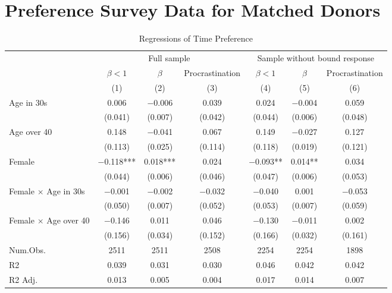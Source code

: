 \documentclass[
]{article}
\begin{document}
\hypertarget{preference-survey-data-for-matched-donors}{%
\section{Preference Survey Data for Matched Donors}\label{preference-survey-data-for-matched-donors}}

\begin{table}

\caption{\label{tab:time-discount}Regressions of Time Preference}
\centering
\fontsize{9}{11}\selectfont
\begin{tabular}[t]{lcccccc}
\toprule
\multicolumn{1}{c}{ } & \multicolumn{3}{c}{Full sample} & \multicolumn{3}{c}{Sample without bound response} \\
\cmidrule(l{3pt}r{3pt}){2-4} \cmidrule(l{3pt}r{3pt}){5-7}
\multicolumn{1}{c}{ } & \multicolumn{1}{c}{$\beta < 1$} & \multicolumn{1}{c}{$\beta$} & \multicolumn{1}{c}{Procrastination} & \multicolumn{1}{c}{$\beta < 1$} & \multicolumn{1}{c}{$\beta$} & \multicolumn{1}{c}{Procrastination} \\
\cmidrule(l{3pt}r{3pt}){2-2} \cmidrule(l{3pt}r{3pt}){3-3} \cmidrule(l{3pt}r{3pt}){4-4} \cmidrule(l{3pt}r{3pt}){5-5} \cmidrule(l{3pt}r{3pt}){6-6} \cmidrule(l{3pt}r{3pt}){7-7}
  & (1) & (2) & (3) & (4) & (5) & (6)\\
\midrule
Age in 30s & \num{0.006} & \num{-0.006} & \num{0.039} & \num{0.024} & \num{-0.004} & \num{0.059}\\
 & (\num{0.041}) & (\num{0.007}) & (\num{0.042}) & (\num{0.044}) & (\num{0.006}) & (\num{0.048})\\
Age over 40 & \num{0.148} & \num{-0.041} & \num{0.067} & \num{0.149} & \num{-0.027} & \num{0.127}\\
 & (\num{0.113}) & (\num{0.025}) & (\num{0.114}) & (\num{0.118}) & (\num{0.019}) & (\num{0.121})\\
Female & \num{-0.118}*** & \num{0.018}*** & \num{0.024} & \num{-0.093}** & \num{0.014}** & \num{0.034}\\
 & (\num{0.044}) & (\num{0.006}) & (\num{0.046}) & (\num{0.047}) & (\num{0.006}) & (\num{0.053})\\
Female $\times$ Age in 30s & \num{-0.001} & \num{-0.002} & \num{-0.032} & \num{-0.040} & \num{0.001} & \num{-0.053}\\
 & (\num{0.050}) & (\num{0.007}) & (\num{0.052}) & (\num{0.053}) & (\num{0.007}) & (\num{0.059})\\
Female $\times$ Age over 40 & \num{-0.146} & \num{0.011} & \num{0.046} & \num{-0.130} & \num{-0.011} & \num{0.002}\\
 & (\num{0.156}) & (\num{0.034}) & (\num{0.152}) & (\num{0.166}) & (\num{0.032}) & (\num{0.161})\\
\midrule
Num.Obs. & \num{2511} & \num{2511} & \num{2508} & \num{2254} & \num{2254} & \num{1898}\\
R2 & \num{0.039} & \num{0.031} & \num{0.030} & \num{0.046} & \num{0.042} & \num{0.042}\\
R2 Adj. & \num{0.013} & \num{0.005} & \num{0.004} & \num{0.017} & \num{0.014} & \num{0.007}\\
\bottomrule
\end{tabular}
\end{table}
\end{document}
